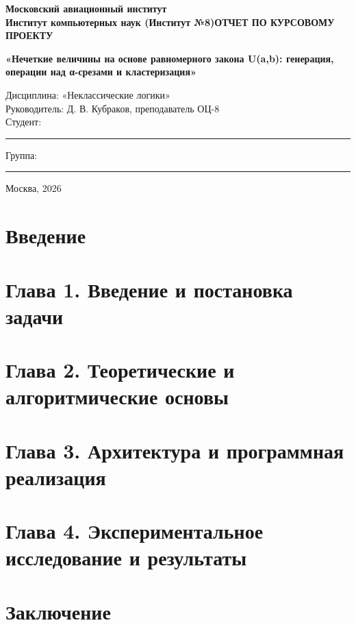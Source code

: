 \documentclass[a4paper,12pt]{article}
\begin{document}
\begin{titlepage}\thispagestyle{empty}\begin{center}\bfseries Московский авиационный институт\\Институт компьютерных наук (Институт №8)\vfill\Large ОТЧЕТ ПО КУРСОВОМУ ПРОЕКТУ\par\vspace{8mm}\normalsize\textbf{«Нечеткие величины на основе равномерного закона U(a,b): генерация, операции над α-срезами и кластеризация»}\vfill\begin{flushleft}\normalfont Дисциплина: «Неклассические логики»\\Руководитель: Д. В. Кубраков, преподаватель ОЦ-8\\Студент: \rule{6cm}{0.4pt}\quad Группа: \rule{2.5cm}{0.4pt}\end{flushleft}\vfill Москва, 2026\end{center}\end{titlepage}
\setcounter{page}{2}\tableofcontents\clearpage
\section*{Введение}\clearpage
\section{Глава 1. Введение и постановка задачи}\clearpage
\section{Глава 2. Теоретические и алгоритмические основы}\clearpage
\section{Глава 3. Архитектура и программная реализация}\clearpage
\section{Глава 4. Экспериментальное исследование и результаты}\clearpage
\section*{Заключение}\clearpage
\nocite{batyrshin2007,demidova,abchuk1979,zadeh1965,arthur2007,blackman2021}\printbibliography[title={Список использованных источников}]
\end{document}
